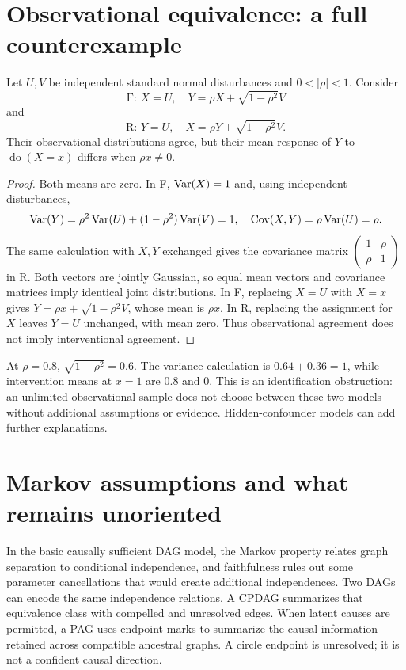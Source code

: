 \documentclass[11pt,oneside]{scrbook}
\begin{document}
\section{Observational equivalence: a full counterexample}
\begin{proposition}
Let $U,V$ be independent standard normal disturbances and $0<|\rho|<1$.
Consider
\[
\text{F: }X=U,\quad Y=\rho X+\sqrt{1-\rho^2}V
\]
and
\[
\text{R: }Y=U,\quad X=\rho Y+\sqrt{1-\rho^2}V.
\]
Their observational distributions agree, but their mean response of $Y$ to
$\operatorname{do}(X=x)$ differs when $\rho x\ne0$.
\end{proposition}
\begin{proof}
Both means are zero. In F, $\operatorname{Var}(X)=1$ and, using independent disturbances,
\[
\operatorname{Var}(Y)=\rho^2\operatorname{Var}(U)+(1-\rho^2)\operatorname{Var}(V)=1,
\quad \operatorname{Cov}(X,Y)=\rho\operatorname{Var}(U)=\rho.
\]
The same calculation with $X,Y$ exchanged gives the covariance matrix
\(
\begin{pmatrix}1&\rho\\\rho&1\end{pmatrix}
\)
in R. Both vectors are jointly Gaussian, so equal mean vectors and covariance
matrices imply identical joint distributions. In F, replacing $X=U$ with $X=x$
gives $Y=\rho x+\sqrt{1-\rho^2}V$, whose mean is $\rho x$.
In R, replacing the assignment for $X$ leaves $Y=U$ unchanged, with mean zero.
Thus observational agreement does not imply interventional agreement.
\end{proof}

At $\rho=0.8$, $\sqrt{1-\rho^2}=0.6$. The variance calculation is
$0.64+0.36=1$, while intervention means at $x=1$ are $0.8$ and $0$.
This is an identification obstruction: an unlimited observational sample does not
choose between these two models without additional assumptions or evidence.
Hidden-confounder models can add further explanations.

\section{Markov assumptions and what remains unoriented}
In the basic causally sufficient DAG model, the Markov property relates graph separation
to conditional independence, and faithfulness rules out some parameter cancellations
that would create additional independences. Two DAGs can encode the same independence
relations. A CPDAG summarizes that equivalence class with compelled and unresolved edges.
When latent causes are permitted, a PAG uses endpoint marks to summarize the causal
information retained across compatible ancestral graphs. A circle endpoint is unresolved;
it is not a confident causal direction.
\end{document}
